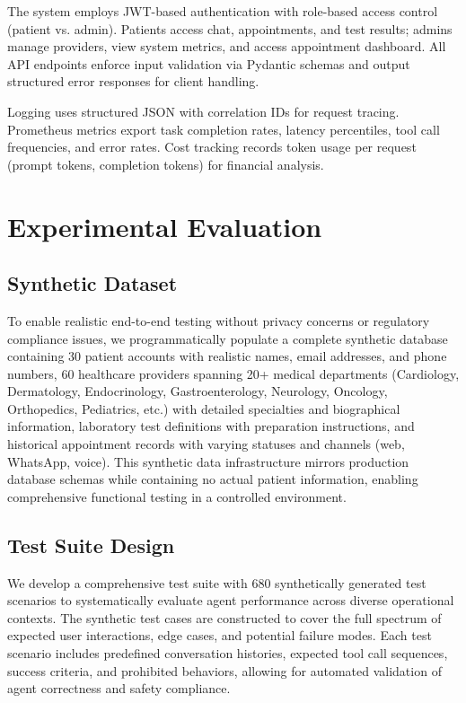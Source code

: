 \documentclass[conference]{IEEEtran}
\begin{document}
The system employs JWT-based authentication with role-based access control (patient vs. admin). Patients access chat, appointments, and test results; admins manage providers, view system metrics, and access appointment dashboard. All API endpoints enforce input validation via Pydantic schemas and output structured error responses for client handling.

Logging uses structured JSON with correlation IDs for request tracing. Prometheus metrics export task completion rates, latency percentiles, tool call frequencies, and error rates. Cost tracking records token usage per request (prompt tokens, completion tokens) for financial analysis.


\section{Experimental Evaluation}

\subsection{Synthetic Dataset}

To enable realistic end-to-end testing without privacy concerns or regulatory compliance issues, we programmatically populate a complete synthetic database containing 30 patient accounts with realistic names, email addresses, and phone numbers, 60 healthcare providers spanning 20+ medical departments (Cardiology, Dermatology, Endocrinology, Gastroenterology, Neurology, Oncology, Orthopedics, Pediatrics, etc.) with detailed specialties and biographical information, laboratory test definitions with preparation instructions, and historical appointment records with varying statuses and channels (web, WhatsApp, voice). This synthetic data infrastructure mirrors production database schemas while containing no actual patient information, enabling comprehensive functional testing in a controlled environment.

\subsection{Test Suite Design}

We develop a comprehensive test suite with 680 synthetically generated test scenarios to systematically evaluate agent performance across diverse operational contexts. The synthetic test cases are constructed to cover the full spectrum of expected user interactions, edge cases, and potential failure modes. Each test scenario includes predefined conversation histories, expected tool call sequences, success criteria, and prohibited behaviors, allowing for automated validation of agent correctness and safety compliance.
\end{document}
